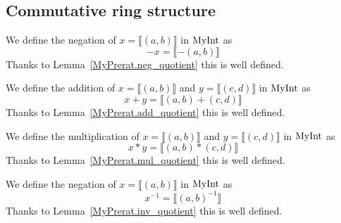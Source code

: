 \subsection{Commutative ring structure}

\begin{definition}
    \label{MyRat.neg}
    \leanok
We define the negation of $x = ⟦ (a, b) ⟧$ in $\mathrm{MyInt}$ as
\[
-x = ⟦ -(a, b) ⟧
\]
Thanks to Lemma~\ref{MyPrerat.neg_quotient} this is well defined.
\end{definition}

\begin{definition}
    \label{MyRat.add}
    \leanok
We define the addition of $x = ⟦ (a, b) ⟧$ and $y = ⟦ (c, d) ⟧$ in $\mathrm{MyInt}$ as
\[
x + y = ⟦ (a,b)+(c,d) ⟧
\]
Thanks to Lemma~\ref{MyPrerat.add_quotient} this is well defined.
\end{definition}

\begin{definition}
    \label{MyRat.mul}
    \leanok
We define the multiplication of $x = ⟦ (a, b) ⟧$ and $y = ⟦ (c, d) ⟧$ in $\mathrm{MyInt}$ as
\[
x * y = ⟦ (a, b)*(c,d) ⟧
\]
Thanks to Lemma~\ref{MyPrerat.mul_quotient} this is well defined.
\end{definition}

\begin{definition}
    \label{MyRat.inv}
    \leanok
We define the negation of $x = ⟦ (a, b) ⟧$ in $\mathrm{MyInt}$ as
\[
x^{-1} = ⟦ (a, b)^{-1} ⟧
\]
Thanks to Lemma~\ref{MyPrerat.inv_quotient} this is well defined.
\end{definition}

